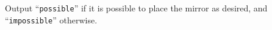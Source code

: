 \begin{Output}
    Output ``\texttt{possible}'' if it is possible to place the mirror as desired, and ``\texttt{impossible}'' otherwise.
\end{Output}
